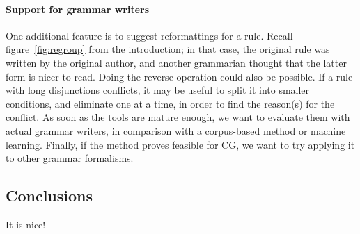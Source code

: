 
\paragraph{Support for grammar writers}
One additional feature is to suggest reformattings for a rule. Recall
figure~\ref{fig:regroup} from the introduction; in that case, the
original rule was written by the original author, and another
grammarian thought that the latter form is nicer to read. Doing the
reverse operation could also be possible. If a rule with long
disjunctions conflicts, it may be useful to split it into smaller
conditions, and eliminate one at a time, in order to find the
reason(s) for the conflict.
As soon as the tools are mature enough, we want to
evaluate them with actual grammar writers,
in comparison with a corpus-based method or machine learning.
Finally, if the method proves feasible for CG, we want
to try applying it to other grammar formalisms.

\subsection{Conclusions}

It is nice!


